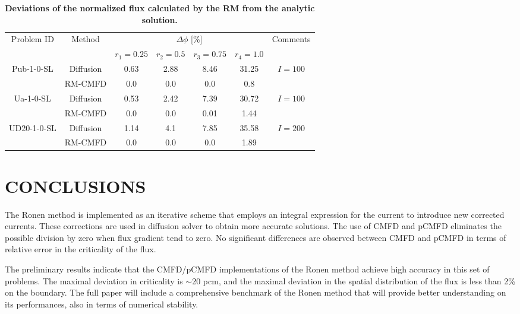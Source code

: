 \documentclass[letterpaper]{mc2021}
\begin{document}
%
\begin{table}[!htb]
	\vspace{-5.5mm}
	\centering
	\small
	\caption{\bf Deviations of the normalized flux calculated by the RM from the analytic solution.}
	\label{table:res2} 
	\begin{tabular}{|c|c|c|c|c|c|c|} \hline 
	\multirow{2}{*}{Problem ID} & \multirow{2}{*}{Method} & \multicolumn{4}{c|}{$\Delta\phi$ [\%]} & \multirow{2}{*}{Comments} \\
	\cline{3-6}
	& & $r_1 = 0.25$ & $r_2 = 0.5$ & $r_3 = 0.75$ & $r_4 = 1.0$ & \\
	\hline
	\multirow{2}{*}{Pub-1-0-SL} & Diffusion  & 0.63 & 2.88 & 8.46 & 31.25 & \multirow{2}{*}{$I=100$} \\
	\cline{2-6}
	& RM-CMFD 	     & 0.0 & 0.0 & 0.0 & 0.8 & \\ \hline
	\multirow{2}{*}{Ua-1-0-SL}  & Diffusion  & 0.53 & 2.42 & 7.39 & 30.72 & \multirow{2}{*}{$I=100$}\\
	\cline{2-6} 
	& RM-CMFD       & 0.0 & 0.0 & 0.01 & 1.44 & \\ \hline 
	\multirow{2}{*}{UD20-1-0-SL} & Diffusion & 1.14 & 4.1 & 7.85 & 35.58 & \multirow{2}{*}{$I=200$} \\ 
	\cline{2-6} 		
	& RM-CMFD      & 0.0 & 0.0 & 0.0 & 1.89 & \\ \hline 		
\end{tabular}
\vspace{-5.0mm}
\end{table}

\section{CONCLUSIONS}

The Ronen method is implemented as an iterative scheme that employs an integral expression for the current to introduce new corrected currents. These corrections are used in diffusion solver to obtain more accurate solutions. The use of CMFD and pCMFD eliminates the possible division by zero when flux gradient tend to zero. No significant differences are observed between CMFD and pCMFD in terms of relative error in the criticality of the flux. 

The preliminary results indicate that the CMFD/pCMFD implementations of the Ronen method achieve high accuracy in this set of problems. The maximal deviation in criticality is $\sim$20 pcm, and the maximal deviation in the spatial distribution of the flux is less than 2\% on the boundary.  
%
The full paper will include a comprehensive benchmark of the Ronen method that will provide better understanding on its performances, also in terms of numerical stability.
\end{document}
